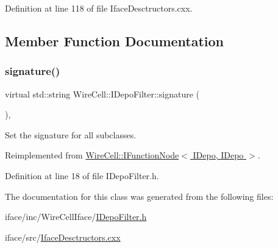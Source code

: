 Definition at line 118 of file Iface\+Desctructors.\+cxx.



\subsection{Member Function Documentation}
\mbox{\label{class_wire_cell_1_1_i_depo_filter_a308041810acd84cc212497121c17ac02}} 
\subsubsection{\texorpdfstring{signature()}{signature()}}
{\footnotesize\ttfamily virtual std\+::string Wire\+Cell\+::\+I\+Depo\+Filter\+::signature (\begin{DoxyParamCaption}{ }\end{DoxyParamCaption})\hspace{0.3cm}{\ttfamily [inline]}, {\ttfamily [virtual]}}



Set the signature for all subclasses. 



Reimplemented from \hyperlink{class_wire_cell_1_1_i_function_node_af59f46cf19ca9fdf4aade1f289feedf2}{Wire\+Cell\+::\+I\+Function\+Node$<$ I\+Depo, I\+Depo $>$}.



Definition at line 18 of file I\+Depo\+Filter.\+h.



The documentation for this class was generated from the following files\+:\begin{DoxyCompactItemize}
\item 
iface/inc/\+Wire\+Cell\+Iface/\hyperlink{_i_depo_filter_8h}{I\+Depo\+Filter.\+h}\item 
iface/src/\hyperlink{_iface_desctructors_8cxx}{Iface\+Desctructors.\+cxx}\end{DoxyCompactItemize}
